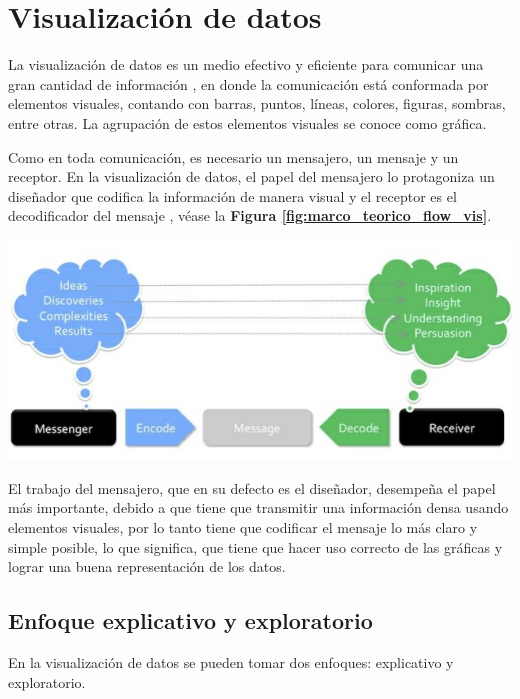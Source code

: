 \section{Visualización de datos}
La visualización de datos es un medio efectivo y eficiente para comunicar una gran cantidad de información \cite{DesignData}, en donde la comunicación está conformada por elementos visuales, contando con barras, puntos, líneas, colores, figuras, sombras, entre otras. La agrupación de estos elementos visuales se conoce como gráfica.

Como en toda comunicación, es necesario un mensajero, un mensaje y un receptor. En la visualización de datos, el papel del mensajero lo protagoniza un diseñador que codifica la información de manera visual y el receptor es el decodificador del mensaje \cite{DataVis}, véase la \textbf{Figura \ref{fig:marco_teorico_flow_vis}}.

\begin{center}
    \bigbreak
    \includegraphics[scale=0.45]{images/marco_teorico/flow_vis.png}
    \label{fig:marco_teorico_flow_vis}
    \bigbreak
\end{center}

El trabajo del mensajero, que en su defecto es el diseñador, desempeña el papel más importante, debido a que tiene que transmitir una información densa usando elementos visuales, por lo tanto tiene que codificar el mensaje lo más claro y simple posible, lo que significa, que tiene que hacer uso correcto de las gráficas y lograr una buena representación de los datos.

\subsection{Enfoque explicativo y exploratorio}
En la visualización de datos se pueden tomar dos enfoques: explicativo y exploratorio.

